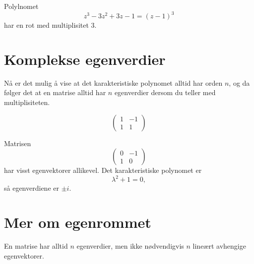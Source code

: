 \begin{ex}
Polylnomet 
\[
z^3-3z^2+3z-1=(z-1)^3
\]
har en rot med multiplisitet 3.
\end{ex}

\section*{Komplekse egenverdier}


Nå er det mulig å vise at det karakteristiske polynomet alltid har orden $n$, 
og da følger det at en matrise alltid har $n$ egenverdier dersom du 
teller med multiplisiteten. 

\begin{ex}
\[
\begin{pmatrix}
1 & -1 \\ 1 &1
\end{pmatrix}
\]
\end{ex}

\begin{ex}
Matrisen
\[
\begin{pmatrix}
0 & -1 \\ 1 &0
\end{pmatrix}
\]
har visst egenvektorer allikevel. Det karakteristiske polynomet er 
\[
\lambda^2+1=0,
\]
så egenverdiene er $\pm i$. 
\end{ex}

\section*{Mer om egenrommet}
En matrise har alltid $n$ egenverdier, men ikke nødvendigvis $n$ lineært avhengige egenvektorer.

\kapittelslutt
